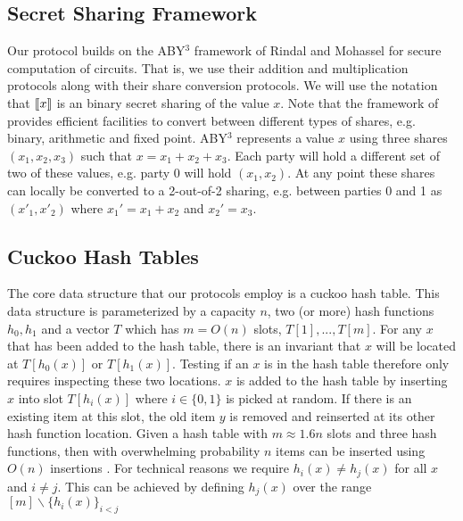 \subsection{Secret Sharing Framework}
Our protocol builds on the ABY$^3$ framework of Rindal and Mohassel\cite{aby3} for secure computation of circuits. That is, we use their addition and multiplication protocols along with their share conversion protocols. We will use the notation that $\llbracket x\rrbracket$ is an binary secret sharing of the value $x$. Note that the framework of \cite{aby3} provides efficient facilities to convert between different types of shares, e.g. binary, arithmetic and fixed point. ABY$^3$ represents a value $x$ using three shares $(x_1,x_2,x_3)$ such that $x=x_1+x_2+x_3$. Each party will hold a different set of two of these values, e.g. party 0 will hold $(x_1,x_2)$. At any point these shares can locally be converted to a 2-out-of-2 sharing, e.g. between parties 0 and 1 as $(x'_1,x'_2)$ where $x_1'=x_1+x_2$ and $x_2'=x_3$. 

\subsection{Cuckoo Hash Tables}

The core data structure that our protocols employ is a cuckoo hash table. This data structure is parameterized by a capacity $n$, two (or more) hash functions $h_0, h_1$ and a vector $T$ which has $m=O(n)$ slots, $T[1], ..., T[m]$. For any $x$ that has been added to the hash table, there is an invariant that $x$ will be located at $T[{h_0(x)}]$ or $T[{h_1(x)}]$. Testing if an $x$ is in the hash table therefore only requires inspecting these two locations. $x$ is added to the hash table by inserting $x$ into slot $T[h_i(x)]$ where $i\in \{0,1\}$ is picked at random. If there is an existing item at this slot, the old item $y$ is removed and reinserted at its other hash function location. Given a hash table with $m\approx1.6n$ slots and three hash functions, then with overwhelming probability $n$ items can be inserted using $O(n)$ insertions \cite{DRRT18}. For technical reasons we require $h_i(x)\neq h_j(x)$ for all $x$ and $i\neq j$. This can be achieved by defining $h_j(x)$ over the range $[m]\backslash \{h_{i}(x)\}_{i < j}$